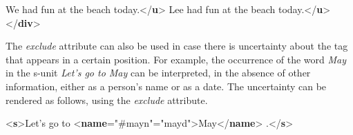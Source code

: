 \begin{shaded}
We had fun at the beach\mbox{}\newline 
\hspace*{1em}\hspace*{1em} today.{</\textbf{u}>}\mbox{}\newline 
{}Lee had fun at the beach today.{</\textbf{u}>}\mbox{}\newline 
{</\textbf{div}>}\end{shaded}\egroup\par \par
The {\itshape exclude} attribute can also be used in case there is uncertainty about the tag that appears in a certain position. For example, the occurrence of the word \textit{May} in the s-unit \textit{Let's go to May} can be interpreted, in the absence of other information, either as a person's name or as a date. The uncertainty can be rendered as follows, using the {\itshape exclude} attribute. \par\bgroup{}\exampleFont \begin{shaded}\noindent\mbox{}{<\textbf{s}>}Let's go to\mbox{}\newline 
{<\textbf{name}\hspace*{1em}{exclude}="{\#mayn}"\hspace*{1em}{xml:id}="{mayd}">}May{</\textbf{name}>}\mbox{}\newline 
{}.{</\textbf{s}>}\end{shaded}\egroup\par \par
